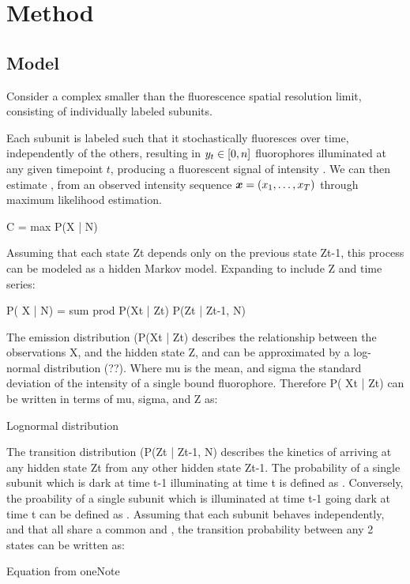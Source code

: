 \section{Method}

\subsection{Model}

Consider a complex smaller than the fluorescence spatial resolution limit,
consisting of \n individually labeled subunits.

Each subunit is labeled such that it stochastically fluoresces over time,
independently of the others, resulting in $y_{t} \in [0, n]$ fluorophores
illuminated at any given timepoint $t$, producing a fluorescent signal of
intensity . We can then estimate \n, from an observed intensity sequence
$\bm{x} = \left( x_{1},\ldots,x_{T} \right)$ through maximum likelihood
estimation.

C = max P(X | N)

Assuming that each state Zt depends only on the previous state Zt-1, this process can be modeled as a hidden Markov model. Expanding to include Z and time series:

P( X | N) = sum prod P(Xt | Zt) P(Zt | Zt-1, N)

The emission distribution (P(Xt | Zt) describes the relationship between the observations X, and the hidden state Z, and can be approximated by a log-normal distribution (??). Where mu is the mean, and sigma the standard deviation of the intensity of a single bound fluorophore. Therefore P( Xt | Zt) can be written in terms of mu, sigma, and Z as:

Lognormal distribution

The transition distribution (P(Zt | Zt-1, N) describes the kinetics of arriving at any hidden state Zt from any other hidden state Zt-1. The probability of a single subunit which is dark at time t-1 illuminating at time t is defined as \pon. Conversely, the proability of a single subunit which is illuminated at time t-1 going dark at time t can be defined as \poff. Assuming that each subunit behaves independently, and that all share a common \pon and \poff, the transition probability between any 2 states can be written as:

Equation from oneNote


